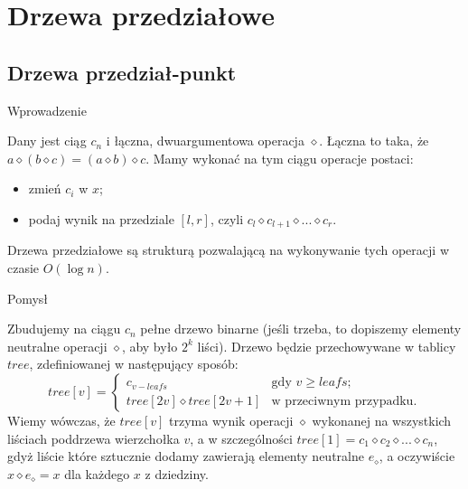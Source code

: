 \documentclass[../main.tex]{subfiles}
\begin{document}
\section{Drzewa przedziałowe}

\subsection{Drzewa przedział-punkt}

\begin{frame}{\subsecname}{Wprowadzenie}

Dany jest ciąg $c_n$ i łączna, dwuargumentowa operacja $\diamond$.
Łączna to taka, że $a\diamond (b\diamond c) = (a\diamond b)\diamond c$.
Mamy wykonać na tym ciągu operacje postaci:
\begin{itemize}
  \item zmień $c_i$ w $x$;
  \item podaj wynik na przedziale $[l,r]$, czyli $c_l \diamond c_{l+1} \diamond ... \diamond c_r$.
\end{itemize}
Drzewa przedziałowe są strukturą pozwalającą na wykonywanie tych operacji
w czasie $O(\log{n})$.

\end{frame}

\begin{frame}{\subsecname}{Pomysł}

Zbudujemy na ciągu $c_n$ pełne drzewo binarne (jeśli trzeba, to dopiszemy elementy neutralne
operacji $\diamond$, aby było $2^k$ liści). Drzewo będzie przechowywane w tablicy $tree$,
zdefiniowanej w następujący sposób:
\[
  \textit{tree}[v] =
    \begin{cases}
      c_{v-leafs} &\text{gdy } v \ge leafs;\\
      tree[2v] \diamond tree[2v+1] &\text{w przeciwnym przypadku}.
    \end{cases}
\]
Wiemy wówczas, że $tree[v]$ trzyma wynik operacji $\diamond$ wykonanej na wszystkich liściach
poddrzewa wierzchołka $v$, a w szczególności $tree[1] = c_1 \diamond c_2 \diamond ... \diamond c_n$,
gdyż liście które sztucznie dodamy zawierają elementy neutralne $e_\diamond$, a oczywiście
$x \diamond e_\diamond = x$ dla każdego $x$ z dziedziny.

\end{frame}
\end{document}
